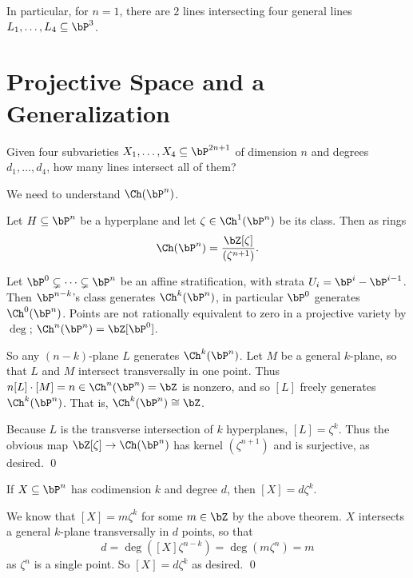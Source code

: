     In particular, for $n=1$, there are $2$ lines intersecting four general lines
    $L_1,\dots,L_4\subseteq\bP^3$.

\eansw

\section{Projective Space and a Generalization}

\bprob

    Given four subvarieties $X_1,\dots,X_4\subseteq\bP^{2n+1}$ of dimension $n$ and degrees $d_1,\dots,d_4$,
    how many lines intersect all of them?

\eprob

We need to understand $\Ch(\bP^n)$.

\bthrm

    Let $H\subseteq\bP^n$ be a hyperplane and let $\zeta\in\Ch^1(\bP^n)$ be its class.
    Then as rings
    $$ \Ch(\bP^n) = \frac{\bZ[\zeta]}{(\zeta^{n+1})} . $$

\ethrm

\bproof

    Let $\bP^0\subsetneq\cdots\subsetneq\bP^n$ be an affine stratification, with strata $U_i=\bP^i-\bP^{i-1}$.
    Then $\bP^{n-k}$'s class generates $\Ch^k(\bP^n)$, in particular $\bP^0$ generates $\Ch^0(\bP^n)$.
    Points are not rationally equivalent to zero in a projective variety by $\deg$; $\Ch^n(\bP^n)=\bZ[\bP^0]$.

    So any $(n-k)$-plane $L$ generates $\Ch^k(\bP^n)$.
    Let $M$ be a general $k$-plane, so that $L$ and $M$ intersect transversally in one point.
    Thus $n[L]\cdot[M]=n\in\Ch^n(\bP^n)=\bZ$ is nonzero, and so $[L]$ freely generates $\Ch^k(\bP^n)$.
    That is, $\Ch^k(\bP^n)\cong\bZ$.

    Because $L$ is the transverse intersection of $k$ hyperplanes, $[L]=\zeta^k$.
    Thus the obvious map $\bZ[\zeta]\to\Ch(\bP^n)$ has kernel $(\zeta^{n+1})$ and is surjective, as desired.
    \qed

\eproof

\bcoro[name={projvarinchow}]

    If $X\subseteq\bP^n$ has codimension $k$ and degree $d$, then $[X]=d\zeta^k$.

\ecoro

\bproof

    We know that $[X]=m\zeta^k$ for some $m\in\bZ$ by the above theorem.
    $X$ intersects a general $k$-plane transversally in $d$ points, so that
    $$ d = \deg([X]\zeta^{n-k}) = \deg(m\zeta^n) = m $$
    as $\zeta^n$ is a single point.
    So $[X]=d\zeta^k$ as desired.
    \qed

